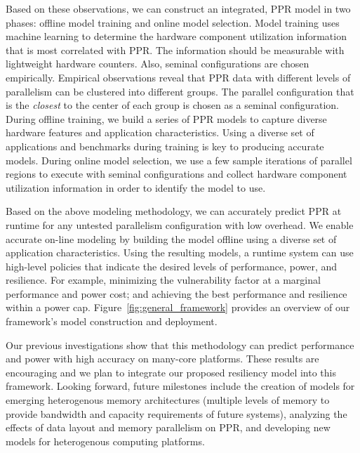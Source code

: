 \documentclass{article}  %
\begin{document}
Based on these observations, we can construct an integrated, PPR model 
in two phases: offline model training and online model selection. Model 
training uses machine learning to determine the hardware component 
utilization information that is most correlated with PPR. The information 
should be measurable with lightweight hardware counters. Also, seminal 
configurations are chosen empirically. Empirical observations reveal that 
PPR data with different levels of parallelism can be clustered into different 
groups. The parallel configuration that is the \emph{closest} to the center 
of each group is chosen as a seminal configuration. 
During offline training, we build a series of PPR models to capture diverse 
hardware features and application characteristics. Using a diverse set of 
applications and benchmarks during training is key to producing accurate 
models. During online model selection, we use a few sample iterations of
parallel regions to execute with seminal configurations and collect
hardware component utilization information in order to identify the model 
to use.

Based on the above modeling methodology, we can accurately predict PPR
at runtime for any untested parallelism configuration with low
overhead. We enable accurate on-line modeling by building the model offline 
using a diverse set of application characteristics. Using the resulting models,
a runtime system can use high-level policies that indicate the desired levels
of performance, power, and resilience. For example, minimizing the
vulnerability factor at a marginal performance and power cost; and
achieving the best performance and resilience within a power
cap. Figure~\ref{fig:general_framework} provides an overview of our 
framework's model construction and deployment.

Our previous investigations show that this methodology can
predict performance and power with high accuracy on many-core
platforms. These results are encouraging and we plan to integrate our
proposed resiliency model into this framework. Looking forward, future
milestones include the creation of models for emerging heterogenous
memory architectures (multiple levels of memory to provide bandwidth
and capacity requirements of future systems), analyzing the effects of
data layout and memory parallelism on PPR, and developing new models
for heterogenous computing platforms.
\end{document}
